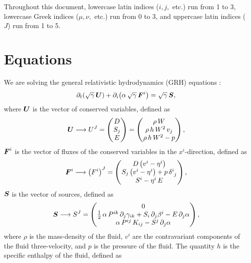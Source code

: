 \documentclass[10pt,preprint]{../aastex}
\begin{document}
Throughout this document, lowercase latin indices ($i,j,$ etc.) run from 1 to 3, lowercase Greek indices ($\mu,\nu,$ etc.) run from 0 to 3, and uppercase latin indices ($J$) run from 1 to 5.

\section{Equations}
We are solving the general relativistic hydrodynamics (GRH) equations \citep{RezzollaRelHyd}:
\begin{equation}\label{Eq:GRH}
\pd{\left(\sqrt{\gamma}\,\bU\right)}{t}+\pd{\left(\alpha\,\sqrt{\gamma}\,\bF^{i}\right)}{i}=\sqrt{\gamma}\,\bS,
\end{equation}
where $\bU$ is the vector of conserved variables, defined as
\begin{equation}
\bU\longrightarrow U^{J}=\begin{pmatrix}D\\ S_{j}\\ E\end{pmatrix}=\begin{pmatrix}\rho\,W\\ \rho\,h\,W^{2}\,v_{j}\\\rho\,h\,W^{2}-p\end{pmatrix},
\end{equation}
$\bF^{i}$ is the vector of fluxes of the conserved variables in the $x^{i}$-direction, defined as
\begin{equation}
\bF^{i}\longrightarrow \left(F^{i}\right)^{J}=\begin{pmatrix}D\left(v^{i}-\eta^{i}\right)\\ S_{j}\left(v^{i}-\eta^{i}\right)+p\,\delta^{i}_{~j}\\S^{i}-\eta^{i}\,E\end{pmatrix},
\end{equation}
$\bS$ is the vector of sources, defined as
\begin{equation}
\bS\longrightarrow S^{J}=\begin{pmatrix}0\\\frac{1}{2}\,\alpha\,P^{ik}\,\pd{\gamma_{ik}}{j}+S_{i}\,\pd{\beta^{i}}{j}-E\,\pd{\alpha}{j}\\\alpha\,P^{ij}\,K_{ij}-S^{j}\,\pd{\alpha}{j}\end{pmatrix},
\end{equation}
where $\rho$ is the mass-density of the fluid, $v^{i}$ are the contravariant components of the fluid three-velocity, and $p$ is the pressure of the fluid. The quantity $h$ is the specific enthalpy of the fluid, defined as
\end{document}
